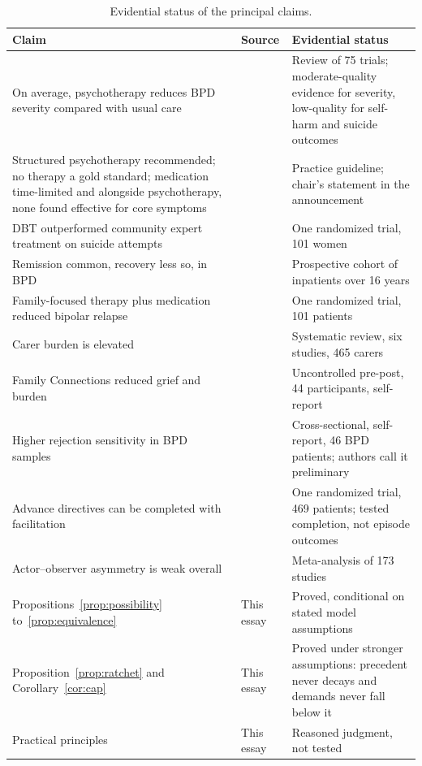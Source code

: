 \documentclass[11pt]{article}
\theoremstyle{definition}
\theoremstyle{remark}
\begin{document}
\begin{table}[ht]
\centering
\small
\renewcommand{\arraystretch}{1.15}
\begin{tabular}{@{}p{}p{}p{}@{}}
\toprule
Claim & Source & Evidential status \\
\midrule
On average, psychotherapy reduces BPD severity compared with usual care & \citet{storebo2020} & Review of 75 trials; moderate-quality evidence for severity, low-quality for self-harm and suicide outcomes \\
Structured psychotherapy recommended; no therapy a gold standard; medication time-limited and alongside psychotherapy, none found effective for core symptoms & \citet{apa2024,apanews2024} & Practice guideline; chair's statement in the announcement \\
DBT outperformed community expert treatment on suicide attempts & \citet{linehan2006} & One randomized trial, 101 women \\
Remission common, recovery less so, in BPD & \citet{zanarini2012} & Prospective cohort of inpatients over 16 years \\
Family-focused therapy plus medication reduced bipolar relapse & \citet{miklowitz2003} & One randomized trial, 101 patients \\
Carer burden is elevated & \citet{bailey2013} & Systematic review, six studies, 465 carers \\
Family Connections reduced grief and burden & \citet{hoffman2005} & Uncontrolled pre-post, 44 participants, self-report \\
Higher rejection sensitivity in BPD samples & \citet{staebler2011} & Cross-sectional, self-report, 46 BPD patients; authors call it preliminary \\
Advance directives can be completed with facilitation & \citet{swanson2006} & One randomized trial, 469 patients; tested completion, not episode outcomes \\
Actor--observer asymmetry is weak overall & \citet{malle2006} & Meta-analysis of 173 studies \\
Propositions~\ref{prop:possibility} to~\ref{prop:equivalence} & This essay & Proved, conditional on stated model assumptions \\
Proposition~\ref{prop:ratchet} and Corollary~\ref{cor:cap} & This essay & Proved under stronger assumptions: precedent never decays and demands never fall below it \\
Practical principles & This essay & Reasoned judgment, not tested \\
\bottomrule
\end{tabular}
\caption{Evidential status of the principal claims.}
\label{tab:status}
\end{table}
\end{document}
